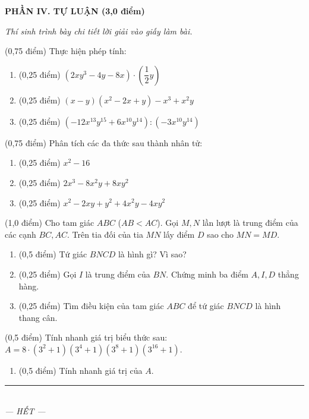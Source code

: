 \documentclass[12pt,a4paper]{article}
\begin{document}
\setcounter{ex}{0}
\noindent\textbf{\large PHẦN IV. TỰ LUẬN (3,0 điểm)}

\textit{Thí sinh trình bày chi tiết lời giải vào giấy làm bài.}

\vspace{1mm}
\begin{ex} (0,75 điểm)
Thực hiện phép tính:
\begin{enumerate}[label=\textbf{\alph*)}, leftmargin=0.8cm, itemsep=2pt]
\item (0,25 điểm) $(2xy^3 - 4y - 8x) \cdot \left(\dfrac{1}{2}y\right)$
\item (0,25 điểm) $(x - y)(x^2 - 2x + y) - x^3 + x^2y$
\item (0,25 điểm) $(-12x^{13}y^{15} + 6x^{10}y^{14}) : (-3x^{10}y^{14})$
\end{enumerate}
\end{ex}
\vspace{0.5mm}

\begin{ex} (0,75 điểm)
Phân tích các đa thức sau thành nhân tử:
\begin{enumerate}[label=\textbf{\alph*)}, leftmargin=0.8cm, itemsep=2pt]
\item (0,25 điểm) $x^2 - 16$
\item (0,25 điểm) $2x^3 - 8x^2y + 8xy^2$
\item (0,25 điểm) $x^2 - 2xy + y^2 + 4x^2y - 4xy^2$
\end{enumerate}
\end{ex}
\vspace{0.5mm}

\begin{ex} (1,0 điểm)
Cho tam giác $ABC$ ($AB < AC$). Gọi $M, N$ lần lượt là trung điểm của các cạnh $BC, AC$. Trên tia đối của tia $MN$ lấy điểm $D$ sao cho $MN = MD$.
\begin{enumerate}[label=\textbf{\alph*)}, leftmargin=0.8cm, itemsep=2pt]
\item (0,5 điểm) Tứ giác $BNCD$ là hình gì? Vì sao?
\item (0,25 điểm) Gọi $I$ là trung điểm của $BN$. Chứng minh ba điểm $A, I, D$ thẳng hàng.
\item (0,25 điểm) Tìm điều kiện của tam giác $ABC$ để tứ giác $BNCD$ là hình thang cân.
\end{enumerate}
\end{ex}
\vspace{0.5mm}

\begin{ex} (0,5 điểm)
Tính nhanh giá trị biểu thức sau: $A = 8 \cdot (3^2 + 1)(3^4 + 1)(3^8 + 1)(3^{16} + 1)$.
\begin{enumerate}[label=\textbf{\alph*)}, leftmargin=0.8cm, itemsep=2pt]
\item (0,5 điểm) Tính nhanh giá trị của $A$.
\end{enumerate}
\end{ex}
\vspace{0.5mm}


\begin{center}
\rule{4cm}{0.4pt}\\
\textit{--- HẾT ---}
\end{center}
\end{document}
